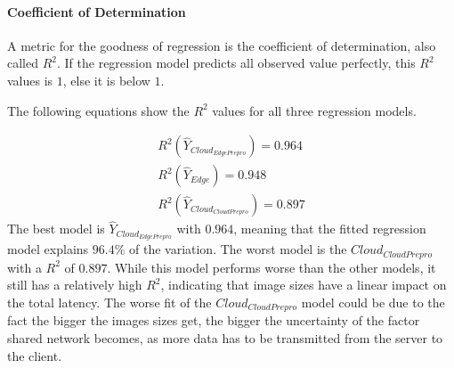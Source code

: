 \paragraph{Coefficient of Determination}
A metric for the goodness of regression is the coefficient of determination, also called $R^2$.
If the regression model predicts all observed value perfectly, this $R^2$ values is $1$, else it is below $1$.

The following equations show the $R^2$ values for all three regression models.

\begin{equation*}
\begin{split}
R^2(\hat{Y}_{Cloud_{EdgePrepro}}) = 0.964\\
R^2(\hat{Y}_{Edge}) = 0.948\\
R^2(\hat{Y}_{Cloud_{CloudPrepro}}) = 0.897
\end{split}
\end{equation*}
The best model is $\hat{Y}_{Cloud_{EdgePrepro}}$ with $0.964$, meaning that the fitted regression model explains $96.4\%$ of the variation.
The worst model is the $Cloud_{CloudPrepro}$ with a $R^2$ of $0.897$.
While this model performs worse than the other models, it still has a relatively high $R^2$, indicating that image sizes have a linear impact on the total latency.
The worse fit of the $Cloud_{CloudPrepro}$ model could be due to the fact the bigger the images sizes get, the bigger the uncertainty of the factor shared network becomes, as more data has to be transmitted from the server to the client.

